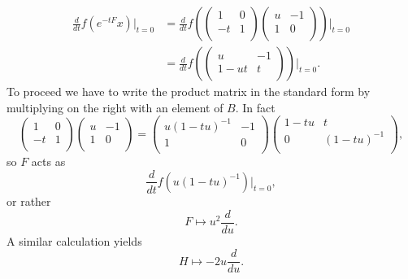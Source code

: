 \documentclass[12pt]{article}
\theoremstyle{plain}
\theoremstyle{definition}
\numberwithin{equation}{section}
\begin{document}
\begin{align*}
\frac{d}{dt} f(e^{-tF} x) |_{t=0} &= \frac{d}{dt} f( \left(
\begin{array}{cc}
1 & 0 \\
-t & 1 \\
\end{array}
\right)\left(
\begin{array}{cc}
u & -1 \\
1 & 0 \\
\end{array}
\right) )|_{t=0} \\
%
&= \frac{d}{dt} f( \left(
\begin{array}{cc}
u & -1 \\
1-ut & t \\
\end{array}
\right) )|_{t=0}.
\end{align*}
To proceed we have to write the product matrix in the standard form by multiplying on the right with an element of $B$. In fact
\[
\left(
\begin{array}{cc}
1 & 0 \\
-t & 1 \\
\end{array}
\right)\left(
\begin{array}{cc}
u & -1 \\
1 & 0 \\
\end{array}
\right) = \left(
\begin{array}{cc}
u(1-tu)^{-1} & -1 \\
1 & 0 \\
\end{array}
\right)\left(
\begin{array}{cc}
1-tu & t \\
0 & (1-tu)^{-1} \\
\end{array}
\right),
\]
so $F$ acts as
\[
\frac{d}{dt} f(u(1-tu)^{-1}) |_{t=0},
\]
or rather
\[
F \mapsto u^2 \frac{d}{du}.
\]
A similar calculation yields
\[
H \mapsto -2u \frac{d}{du}.
\]
\end{document}
